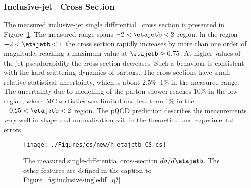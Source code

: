 \subsubsection*{Inclusive-jet \dsdetajetb~Cross Section}
The measured inclusive-jet single differential \dsdetajetb~cross section is presented in Figure~\ref{fig:inclusivesingledif_eta}. The measured range spans $-2 < \etajetb < 2$ region. In the region  $-2 < \etajetb < 1$ the cross section rapidly increases by more than one order of magnitude, reaching a maximum value at $\etajetb \approx 0.75$. At higher values of the jet pseudorapidity the cross section decreases. Such a behaviour is consistent with the hard scattering dynamics of partons. The cross sections have small relative statistical uncertainty, which is about 2.5\%--1\% in the measured range. %
The uncertainty due to modelling of the parton shower reaches 10\% in the low \etajetb region, where MC statistics was limited and less than 1\% in the $-0.25 < \etajetb < 2$ region. The pQCD prediction describes the measurements very well in shape and normalisation within the theoretical and experimental errors.
\begin{figure}[p]
	\centering
		\texttt{[image: ./Figures/cs/new/h\_etajetb\_CS\_cs]}
	\caption{The measured single-differential cross-section $d\sigma/d\etajetb$. The other features are defined in the caption to Figure~\ref{fig:inclusivesingledif_q2}}
	\label{fig:inclusivesingledif_eta}
\end{figure}

